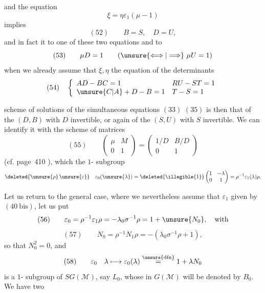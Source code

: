 
and the equation
\[
\xi=\eta\varepsilon_1(\mu-1)
\]
 implies
\[
(52)\qquad B=S,\quad D=U,
\]
and in fact it  to one of these two equations and to
\[
(53)\qquad \mu D=1\qquad (\unsure{\Longleftrightarrow|\Longrightarrow}\ \mu U=1)
\]
when we already assume that $\xi,\eta$  the equation of the  determinants 
\[
(54)\quad
\left\{\begin{array}{ll}
AD-BC=1 & RU-ST=1\\
\unsure{C|A}+D-B=1 & T-S=1
\end{array}\right.
\]

  scheme of solutions of the simultaneous equations $(33)$  $(35)$ is then that of the $(D,B)$ with $D$ invertible, or again of the $(S,U)$ with $S$ invertible. We can identify it with the scheme of matrices
\[
(55)\qquad
\begin{pmatrix}\mu&M\\0&1\end{pmatrix}
=\begin{pmatrix}1/D&B/D\\0&1\end{pmatrix}
\]
(cf. page~410 ), which  the $1$- subgroup
\[
\deleted{\unsure{\rho}\,\unsure{\varepsilon}}\quad
\varepsilon_0(\unsure{\lambda})=\deleted{\illegible{1}}
\begin{pmatrix}1&-\lambda\\0&1\end{pmatrix}
=\rho^{-1}\varepsilon_1(\lambda)\rho.
\]



Let us return to the general case, where we nevertheless assume that $\varepsilon_1$ given by $(40\ \mathrm{bis})$,  let us put
\[
(56)\qquad \varepsilon_0=\rho^{-1}\varepsilon_1\rho
=-\lambda_0\sigma^{-1}\rho=1+\unsure{N_0},\quad\text{with}
\]
\[
(57)\qquad N_0=\rho^{-1}N_1\rho=-(\lambda_0\sigma^{-1}\rho+1),
\]
so that $N_0^2=0$, and
\[
(58)\qquad \varepsilon_0\quad\lambda\longmapsto
\varepsilon_0(\lambda)\overset{\unsure{\mathrm{dfn}}}{=}1+\lambda N_0
\]
is a $1$- subgroup of $SG(\mathcal M)$, say $L_0$, whose  in $G(\mathcal M)$ will be denoted by $B_0$. We have two 

